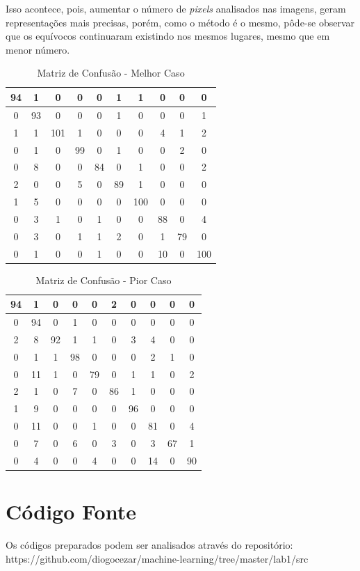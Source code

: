 \documentclass[12pt]{article}
\begin{document}
Isso acontece, pois, aumentar o número de \textit{pixels} analisados nas imagens, geram representações mais precisas, porém, como o método é o mesmo, pôde-se observar que os equívocos continuaram existindo nos mesmos lugares, mesmo que em menor número.

\begin{table}[!htb]
  \centering
  \begin{tabular}{|c|c|c|c|c|c|c|c|c|c|}
  \hline
  94 & 1  & 0   & 0  & 0  & 1  & 1   & 0  & 0  & 0   \\ \hline
  0  & 93 & 0   & 0  & 0  & 1  & 0   & 0  & 0  & 1   \\ \hline
  1  & 1  & 101 & 1  & 0  & 0  & 0   & 4  & 1  & 2   \\ \hline
  0  & 1  & 0   & 99 & 0  & 1  & 0   & 0  & 2  & 0   \\ \hline
  0  & 8  & 0   & 0  & 84 & 0  & 1   & 0  & 0  & 2   \\ \hline
  2  & 0  & 0   & 5  & 0  & 89 & 1   & 0  & 0  & 0   \\ \hline
  1  & 5  & 0   & 0  & 0  & 0  & 100 & 0  & 0  & 0   \\ \hline
  0  & 3  & 1   & 0  & 1  & 0  & 0   & 88 & 0  & 4   \\ \hline
  0  & 3  & 0   & 1  & 1  & 2  & 0   & 1  & 79 & 0   \\ \hline
  0  & 1  & 0   & 0  & 1  & 0  & 0   & 10 & 0  & 100 \\ \hline
  \end{tabular}
  \caption{Matriz de Confusão - Melhor Caso}
  \label{tab:matriz_confusao_melhor}
\end{table}

\begin{table}[!htb]
  \centering
  \begin{tabular}{|c|c|c|c|c|c|c|c|c|c|}
  \hline
  94 & 1  & 0  & 0  & 0  & 2  & 0  & 0  & 0  & 0  \\ \hline
  0  & 94 & 0  & 1  & 0  & 0  & 0  & 0  & 0  & 0  \\ \hline
  2  & 8  & 92 & 1  & 1  & 0  & 3  & 4  & 0  & 0  \\ \hline
  0  & 1  & 1  & 98 & 0  & 0  & 0  & 2  & 1  & 0  \\ \hline
  0  & 11 & 1  & 0  & 79 & 0  & 1  & 1  & 0  & 2  \\ \hline
  2  & 1  & 0  & 7  & 0  & 86 & 1  & 0  & 0  & 0  \\ \hline
  1  & 9  & 0  & 0  & 0  & 0  & 96 & 0  & 0  & 0  \\ \hline
  0  & 11 & 0  & 0  & 1  & 0  & 0  & 81 & 0  & 4  \\ \hline
  0  & 7  & 0  & 6  & 0  & 3  & 0  & 3  & 67 & 1  \\ \hline
  0  & 4  & 0  & 0  & 4  & 0  & 0  & 14 & 0  & 90 \\ \hline
  \end{tabular}
  \caption{Matriz de Confusão - Pior Caso}
  \label{tab:matriz_confusao_pior}
\end{table}

\section{Código Fonte}

Os códigos preparados podem ser analisados através do repositório: https://github.com/diogocezar/machine-learning/tree/master/lab1/src
\end{document}
